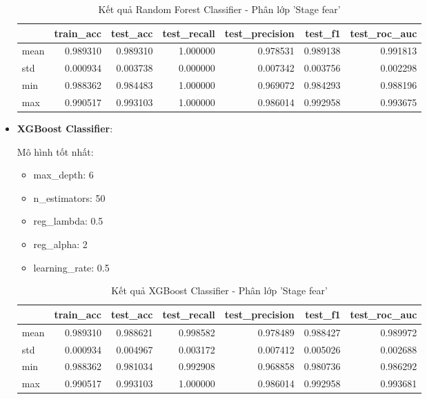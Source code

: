 \begin{itemize}
            \begin{table}[htbp]
                \centering
                \caption{Kết quả Random Forest Classifier - Phân lớp 'Stage fear'}
                \label{tab:Behavior-stage-RF}
                \begin{tabular}{lrrrrrr}
                    \hline
                     & train\_acc & test\_acc & test\_recall & test\_precision & test\_f1 & test\_roc\_auc \\
                    \hline
                    mean & 0.989310 & 0.989310 & 1.000000 & 0.978531 & 0.989138 & 0.991813 \\
                    std & 0.000934 & 0.003738 & 0.000000 & 0.007342 & 0.003756 & 0.002298 \\
                    min & 0.988362 & 0.984483 & 1.000000 & 0.969072 & 0.984293 & 0.988196 \\
                    max & 0.990517 & 0.993103 & 1.000000 & 0.986014 & 0.992958 & 0.993675 \\
                    \hline
                \end{tabular}
            \end{table}
            
            \FloatBarrier

        \item \textbf{XGBoost Classifier}:
        
            Mô hình tốt nhất:
            \begin{itemize}
                \item max\_depth: 6
                \item n\_estimators: 50
                \item reg\_lambda: 0.5
                \item reg\_alpha: 2
                \item learning\_rate: 0.5
            \end{itemize}

            \begin{table}[htbp]
                \centering
                \caption{Kết quả XGBoost Classifier - Phân lớp 'Stage fear'}
                \label{tab:Behavior-stage-XGBC}
                \begin{tabular}{lrrrrrr}
                \hline
                 & train\_acc & test\_acc & test\_recall & test\_precision & test\_f1 & test\_roc\_auc \\
                \hline
                mean & 0.989310 & 0.988621 & 0.998582 & 0.978489 & 0.988427 & 0.989972 \\
                std & 0.000934 & 0.004967 & 0.003172 & 0.007412 & 0.005026 & 0.002688 \\
                min & 0.988362 & 0.981034 & 0.992908 & 0.968858 & 0.980736 & 0.986292 \\
                max & 0.990517 & 0.993103 & 1.000000 & 0.986014 & 0.992958 & 0.993681 \\
                \hline
                \end{tabular}
            \end{table}


\end{itemize}
